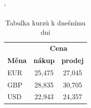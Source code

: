 \documentclass[a4paper, 11pt]{article}
\begin{document}
\bigskip

\begin{table}[ht]
    \begin{center}
        \catcode`
        \begin{tabular}{|l|c|c|}
            \hline
            & \multicolumn{2}{c|}{\textbf{Cena}} \\
            \cline{2-3}
            \textbf{Měna} & \textbf{nákup} & \textbf{prodej} \\ \hline
            EUR           & 25,475         & 27,045          \\
            GBP           & 28,835         & 30,705          \\
            USD           & 22,943         & 24,357          \\ \hline
        \end{tabular}
        \caption{Tabulka kurzů k dnešnímu dni}
        \label{tabulka_kurzu}
    \end{center}
\end{table}
\end{document}

